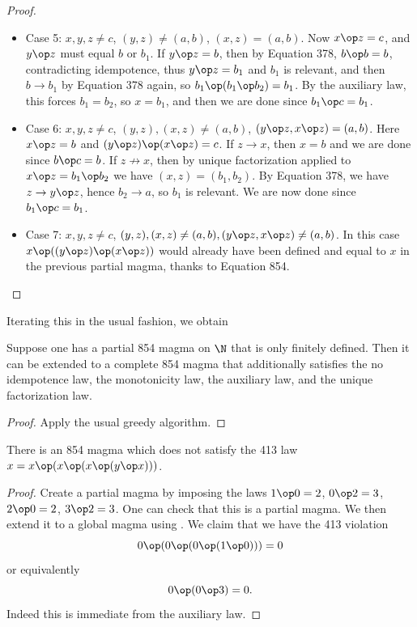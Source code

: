 \begin{proof}
\begin{itemize}
  \item Case 5: $x,y,z \neq c$, $(y,z) \neq (a,b)$, $(x,z) = (a,b)$.  Now $x \op z = c$, and $y \op z$ must equal $b$ or $b_1$.  If $y \op z = b$, then by Equation 378, $b \op b = b$, contradicting idempotence, thus $y \op z = b_1$ and $b_1$ is relevant, and then $b \to b_1$ by Equation 378 again, so $b_1 \op (b_1 \op b_2) = b_1$.  By the auxiliary law, this forces $b_1 = b_2$, so $x = b_1$, and then we are done since $b_1 \op c = b_1$.
  \item Case 6: $x,y,z \neq c$, $(y,z), (x,z) \neq (a,b)$, $(y \op z, x \op z) = (a,b)$.  Here $x \op z = b$ and $(y \op z) \op (x \op z) = c$.  If $z \to x$, then $x=b$ and we are done since $b \op c = b$.  If $z \not \to x$, then by unique factorization applied to $x \op z = b_1 \op b_2$ we have $(x,z) = (b_1,b_2)$.  By Equation 378, we have $z \to y \op z$, hence $b_2 \to a$, so $b_1$ is relevant.  We are now done since $b_1 \op c = b_1$.
  \item Case 7: $x,y,z \neq c$, $(y,z), (x,z) \neq (a,b), (y \op z, x \op z) \neq (a,b)$.  In this case $x \op ((y \op z) \op (x \op z))$ would already have been defined and equal to $x$ in the previous partial magma, thanks to Equation 854.
\end{itemize}
\end{proof}

Iterating this in the usual fashion, we obtain

\begin{corollary}[854 extension]\label{extend-854}\leanok{}
Suppose one has a partial 854 magma on $\N$ that is only finitely defined.  Then it can be extended to a complete 854 magma that additionally satisfies the no idempotence law, the monotonicity law, the auxiliary law, and the unique factorization law.
\end{corollary}

\begin{proof}  Apply the usual greedy algorithm.
\end{proof}

\begin{corollary}\leanok{}\label{854-413}  There is an 854 magma which does not satisfy the 413 law $x = x \op (x \op (x \op (y \op x)))$.
\end{corollary}

\begin{proof} Create a partial magma by imposing the laws $1 \op 0 = 2$, $0 \op 2 = 3$, $2 \op 0 = 2$, $3 \op 2 = 3$.  One can check that this is a partial magma.  We then extend it to a global magma using .  We claim that we have the 413 violation
  $$ 0 \op (0 \op (0 \op (1 \op 0))) = 0$$
  or equivalently
  $$ 0 \op (0 \op 3) = 0.$$
Indeed this is immediate from the auxiliary law.
\end{proof}

